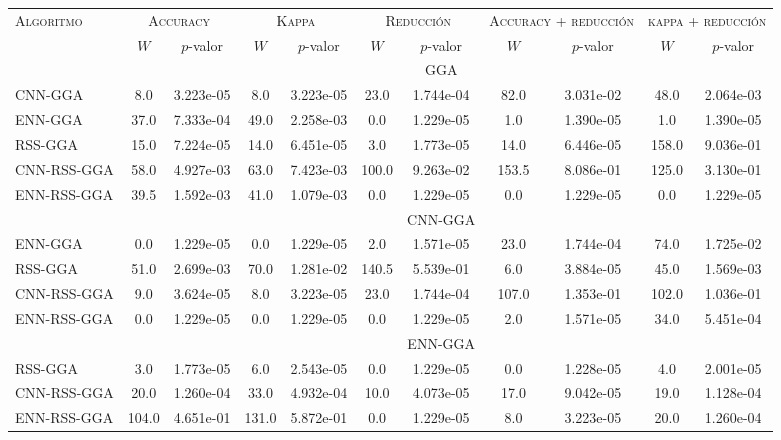 \begin{table}[]
\centering
\begin{adjustbox}{max width =\textwidth}
\begin{tabular}{l c c c c c c c c c c}
\hline
\multirow{2}{*}{\textsc{Algoritmo}}
	& \multicolumn{2}{c}{\textsc{Accuracy}}
	& \multicolumn{2}{c}{\textsc{Kappa}}
	& \multicolumn{2}{c}{\textsc{Reducción}} 
	& \multicolumn{2}{c}{\textsc{Accuracy + reducción}} 
	& \multicolumn{2}{c}{\textsc{kappa + reducción}} \\
 & $W$ & $p$-valor & $W$ & $p$-valor & $W$ & $p$-valor & $W$ & $p$-valor & $W$ & $p$-valor \\
\hline
\hline

 & & & & & & GGA & & & & \\

CNN-GGA & 8.0 & 3.223e-05 & 8.0 & 3.223e-05 & 23.0 & 1.744e-04 & 82.0 & 3.031e-02 & 48.0 & 2.064e-03 \\ 
ENN-GGA & 37.0 & 7.333e-04 & 49.0 & 2.258e-03 & 0.0 & 1.229e-05 & 1.0 & 1.390e-05 & 1.0 & 1.390e-05 \\ 
RSS-GGA & 15.0 & 7.224e-05 & 14.0 & 6.451e-05 & 3.0 & 1.773e-05 & 14.0 & 6.446e-05 & 158.0 & 9.036e-01 \\ 
CNN-RSS-GGA & 58.0 & 4.927e-03 & 63.0 & 7.423e-03 & 100.0 & 9.263e-02 & 153.5 & 8.086e-01 & 125.0 & 3.130e-01 \\ 
ENN-RSS-GGA & 39.5 & 1.592e-03 & 41.0 & 1.079e-03 & 0.0 & 1.229e-05 & 0.0 & 1.229e-05 & 0.0 & 1.229e-05 \\

\hline

 & & & & & & CNN-GGA & & & & \\
ENN-GGA & 0.0 & 1.229e-05 & 0.0 & 1.229e-05 & 2.0 & 1.571e-05 & 23.0 & 1.744e-04 & 74.0 & 1.725e-02 \\ 
RSS-GGA & 51.0 & 2.699e-03 & 70.0 & 1.281e-02 & 140.5 & 5.539e-01 & 6.0 & 3.884e-05 & 45.0 & 1.569e-03 \\ 
CNN-RSS-GGA & 9.0 & 3.624e-05 & 8.0 & 3.223e-05 & 23.0 & 1.744e-04 & 107.0 & 1.353e-01 & 102.0 & 1.036e-01 \\ 
ENN-RSS-GGA & 0.0 & 1.229e-05 & 0.0 & 1.229e-05 & 0.0 & 1.229e-05 & 2.0 & 1.571e-05 & 34.0 & 5.451e-04 \\ 

\hline

 & & & & & & ENN-GGA & & & & \\
RSS-GGA & 3.0 & 1.773e-05 & 6.0 & 2.543e-05 & 0.0 & 1.229e-05 & 0.0 & 1.228e-05 & 4.0 & 2.001e-05 \\ 
CNN-RSS-GGA & 20.0 & 1.260e-04 & 33.0 & 4.932e-04 & 10.0 & 4.073e-05 & 17.0 & 9.042e-05 & 19.0 & 1.128e-04 \\ 
ENN-RSS-GGA & 104.0 & 4.651e-01 & 131.0 & 5.872e-01 & 0.0 & 1.229e-05 & 8.0 & 3.223e-05 & 20.0 & 1.260e-04 \\


\end{tabular}
\end{adjustbox}
\end{table}
